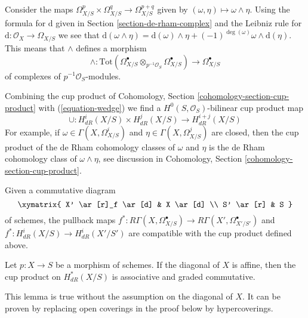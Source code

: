 \noindent
Consider the maps
$\Omega^p_{X/S} \times \Omega^q_{X/S} \to \Omega^{p + q}_{X/S}$
given by $(\omega , \eta) \longmapsto \omega \wedge \eta$.
Using the formula for $\text{d}$ given in Section \ref{section-de-rham-complex}
and the Leibniz rule for $\text{d} : \mathcal{O}_X \to \Omega_{X/S}$
we see that $\text{d}(\omega \wedge \eta) = \text{d}(\omega) \wedge \eta +
(-1)^{\deg(\omega)} \omega \wedge \text{d}(\eta)$. This means that
$\wedge$ defines a morphism
\begin{equation}
\label{equation-wedge}
\wedge :
\text{Tot}(
\Omega^\bullet_{X/S} \otimes_{p^{-1}\mathcal{O}_S} \Omega^\bullet_{X/S})
\longrightarrow
\Omega^\bullet_{X/S}
\end{equation}
of complexes of $p^{-1}\mathcal{O}_S$-modules.

\medskip\noindent
Combining the cup product of
Cohomology, Section \ref{cohomology-section-cup-product}
with (\ref{equation-wedge}) we find a
$H^0(S, \mathcal{O}_S)$-bilinear cup product map
$$
\cup : H^i_{dR}(X/S) \times H^j_{dR}(X/S) \longrightarrow H^{i + j}_{dR}(X/S)
$$
For example, if $\omega \in \Gamma(X, \Omega^i_{X/S})$ and
$\eta \in \Gamma(X, \Omega^j_{X/S})$ are closed, then
the cup product of the de Rham cohomology classes of
$\omega$ and $\eta$ is the de Rham cohomology class of $\omega \wedge \eta$,
see discussion in Cohomology, Section \ref{cohomology-section-cup-product}.

\medskip\noindent
Given a commutative diagram
$$
\xymatrix{
X' \ar[r]_f \ar[d] & X \ar[d] \\
S' \ar[r] & S
}
$$
of schemes, the pullback maps
$f^* : R\Gamma(X, \Omega^\bullet_{X/S}) \to R\Gamma(X', \Omega^\bullet_{X'/S'})$
and
$f^* : H^i_{dR}(X/S) \longrightarrow H^i_{dR}(X'/S')$
are compatible with the cup product defined above.

\begin{lemma}
\label{lemma-cup-product-graded-commutative}
Let $p : X \to S$ be a morphism of schemes. If the diagonal of $X$ is
affine, then the cup product on $H^*_{dR}(X/S)$ is associative and
graded commutative.
\end{lemma}

\noindent
This lemma is true without the assumption on the diagonal of $X$.
It can be proven by replacing open coverings in the proof below
by hypercoverings.

